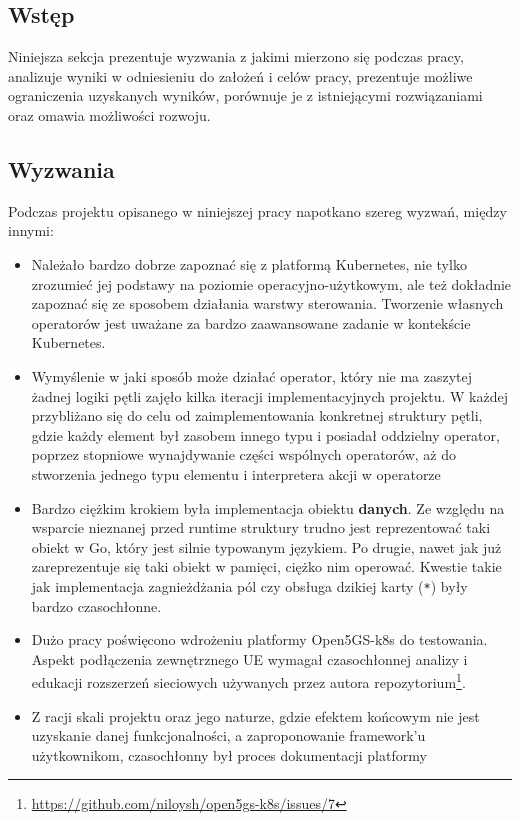 \subsection{Wstęp}
Niniejsza sekcja prezentuje wyzwania z jakimi mierzono się podczas pracy, analizuje wyniki w odniesieniu do założeń i celów pracy, prezentuje możliwe ograniczenia uzyskanych wyników, porównuje je z istniejącymi rozwiązaniami oraz omawia możliwości rozwoju.

\subsection{Wyzwania}

Podczas projektu opisanego w niniejszej pracy napotkano szereg wyzwań, między innymi:
\begin{itemize}
    \item Należało bardzo dobrze zapoznać się z platformą Kubernetes, nie tylko zrozumieć jej podstawy na poziomie operacyjno-użytkowym, ale też dokładnie zapoznać się ze sposobem działania warstwy sterowania. Tworzenie własnych operatorów jest uważane za bardzo zaawansowane zadanie w kontekście Kubernetes.
    \item Wymyślenie w jaki sposób może działać operator, który nie ma zaszytej żadnej logiki pętli zajęło kilka iteracji implementacyjnych projektu. W każdej przybliżano się do celu od zaimplementowania konkretnej struktury pętli, gdzie każdy element był zasobem innego typu i posiadał oddzielny operator, poprzez stopniowe wynajdywanie części wspólnych operatorów, aż do stworzenia jednego typu elementu i interpretera akcji w operatorze
    \item Bardzo ciężkim krokiem była implementacja obiektu \textbf{danych}. Ze względu na wsparcie nieznanej przed runtime struktury trudno jest reprezentować taki obiekt w Go, który jest silnie typowanym językiem. Po drugie, nawet jak już zareprezentuje się taki obiekt w pamięci, ciężko nim operować. Kwestie takie jak implementacja zagnieżdżania pól czy obsługa dzikiej karty (\texttt{*}) były bardzo czasochłonne.
    \item Dużo pracy poświęcono wdrożeniu platformy Open5GS-k8s do testowania. Aspekt podłączenia zewnętrznego UE wymagał czasochłonnej analizy i edukacji rozszerzeń sieciowych używanych przez autora repozytorium\footnote{\url{https://github.com/niloysh/open5gs-k8s/issues/7}}.
    \item Z racji skali projektu oraz jego naturze, gdzie efektem końcowym nie jest uzyskanie danej funkcjonalności, a zaproponowanie framework'u użytkownikom, czasochłonny był proces dokumentacji platformy
\end{itemize}

